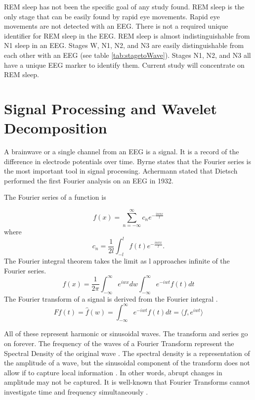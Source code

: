 \documentclass[12pt, oneside]{book}
\begin{document}
REM sleep has not been the specific goal of any study found. REM sleep is the only stage that can be easily found by rapid eye movements. Rapid eye movements are not detected with an EEG. There is not a required unique identifier for REM sleep in the EEG. REM sleep is almost indistinguishable from N1 sleep in an EEG. Stages W, N1, N2, and N3 are easily distinguishable from each other with an EEG (see table \ref{tab:stagetoWave}). Stages N1, N2, and N3 all have a unique EEG marker to identify them. Current study will concentrate on REM sleep.  


\section{\textbf{Signal Processing and Wavelet Decomposition}}
A brainwave or a single channel from an EEG is a signal. It is a record of the difference in electrode potentials over time. Byrne \cite{byrne_signal_2014} states that the Fourier series is the most important tool in signal processing. Achermann \cite{achermann_eeg_2009} stated that Dietsch \cite{dietsch_fourier-analyse_1932} performed the first Fourier analysis on an EEG in 1932. 

The Fourier series of a function is \cite{debnath_wavelet_2014}

\begin{equation}
f(x)=\sum_{n=-\infty}^{\infty}c_n e^{- \frac{in\pi x}{l}}
\end{equation}
where 
\begin{equation}
c_n = \frac{1}{2l} \int_{-l}^{l} f(t) e^{- \frac{in\pi x}{l}}.
\end{equation}
The Fourier integral theorem takes the limit as l approaches infinite of the Fourier series. \cite{debnath_wavelet_2014}
\begin{equation}
f(x) = \frac{1}{2\pi} \int_{-\infty}^{\infty} e^{iwx}dw \int_{-\infty}^{\infty} e^{-iwt}f(t)dt
\end{equation}
The Fourier transform of a signal is derived from the Fourier integral \cite{debnath_wavelet_2014}.
\begin{equation}
F{f(t)} = \hat{f}(w) = \int_{-\infty}^{\infty} e^{-iwt}f(t)dt = \langle f,e^{iwt}\rangle
\end{equation}

All of these represent harmonic or sinusoidal waves. The transform and series go on forever. The frequency of the waves of a Fourier Transform represent the Spectral Density of the original wave \cite{noauthor_time-frequency_nodate}. The spectral density is a representation of the amplitude of a wave\cite{noauthor_spectral_2017}, but the sinusoidal component of the transform does not allow if to capture local information \cite{debnath_wavelet_2014}. In other words, abrupt changes in amplitude may not be captured. It is well-known that Fourier Transforms cannot investigate time and frequency simultaneously \cite{sinha_artificial_2008} \cite{ebrahimi_automatic_2008} \cite{kurt_ann-based_2009} \cite{crasto_wavelet_2017} \cite{debnath_wavelet_2014}.
\end{document}
